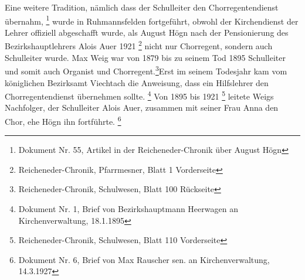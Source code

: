 Eine weitere Tradition, nämlich dass der Schulleiter den
Chorregentendienst übernahm, \footnote{Dokument Nr. 55, Artikel in der
Reicheneder-Chronik über August Högn} wurde in Ruhmannsfelden
fortgeführt, obwohl der Kirchendienst der Lehrer offiziell abgeschafft
wurde, als August Högn nach der Pensionierung des Bezirkshauptlehrers
Alois Auer 1921 \footnote{Reicheneder-Chronik, Pfarrmesner, Blatt 1
Vorderseite} nicht nur Chorregent, sondern
auch Schulleiter wurde. Max Weig war von 1879 bis zu seinem Tod 1895
Schulleiter und somit auch Organist und Chorregent.\footnote{
Reicheneder-Chronik, Schulwesen, Blatt 100
Rückseite}Erst im seinem Todesjahr kam vom
königlichen Bezirksamt Viechtach die Anweisung, dass ein Hilfslehrer
den Chorregentendienst übernehmen sollte. \footnote{Dokument Nr. 1,
Brief von Bezirkshauptmann Heerwagen an Kirchenverwaltung, 18.1.1895}
Von 1895 bis 1921 \footnote{Reicheneder-Chronik, Schulwesen, Blatt 110
Vorderseite} leitete Weigs Nachfolger, der Schulleiter Alois Auer,
zusammen mit seiner Frau Anna den Chor, ehe Högn ihn
fortführte. \footnote{Dokument Nr. 6, Brief von Max Rauscher sen. an
Kirchenverwaltung, 14.3.1927}

